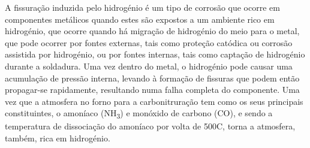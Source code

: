 A fissuração induzida pelo hidrogénio é um tipo de corrosão que ocorre em componentes metálicos quando estes são expostos a um ambiente rico em hidrogénio, que ocorre quando há migração de hidrogénio do meio para o metal, que pode ocorrer por fontes externas, tais como proteção catódica ou corrosão assistida por hidrogénio, ou por fontes internas, tais como captação de hidrogénio durante a soldadura. Uma vez dentro do metal, o hidrogénio pode causar uma acumulação de pressão interna, levando à formação de fissuras que podem então propagar-se rapidamente, resultando numa falha completa do componente. Uma vez que a atmosfera no forno para a carbonitruração tem como os seus principais constituintes, o amoníaco (NH\textsubscript{3}) e monóxido de carbono (CO), e sendo a temperatura de dissociação do amoníaco por volta de 500\textdegree C, torna a atmosfera, também, rica em hidrogénio.
